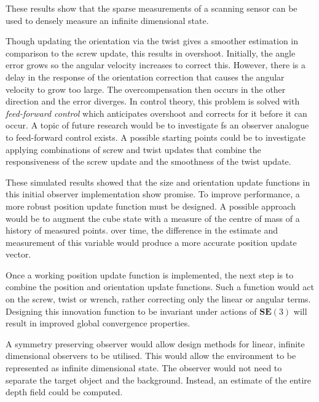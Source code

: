 These results show that the sparse measurements of a scanning sensor can be used to densely measure an infinite dimensional state. 

Though updating the orientation via the twist gives a smoother estimation in comparison to the screw update, this results in overshoot. Initially, the angle error grows so the angular velocity increases to correct this. However, there is a delay in the response of the orientation correction that causes the angular velocity to grow too large. The overcompensation then occurs in the other direction and the error diverges. In control theory, this problem is solved with \textit{feed-forward control} which anticipates overshoot and corrects for it before it can occur. A topic of future research would be to investigate fs an observer analogue to feed-forward control exists. A possible starting points could be to investigate applying combinations of screw and twist updates that combine the responsiveness of the screw update and the smoothness of the twist update. 

These simulated results showed that the size and orientation update functions in this initial observer implementation show promise. To improve performance, a more robust position update function must be designed. A possible approach would be to augment the cube state with a measure of the centre of mass of a history of measured points. over time, the difference in the estimate and measurement of this variable would produce a more accurate position update vector.

Once a working position update function is implemented, the next step is to combine the position and orientation update functions. Such a function would act on the screw, twist or wrench, rather correcting only the linear or angular terms. Designing this innovation function to be invariant under actions of $\mathbf{SE}(3)$ will result in improved global convergence properties.

A symmetry preserving observer would allow design methods for linear, infinite dimensional observers to be utilised. This would allow the environment to be represented as infinite dimensional state. The observer would not need to separate the target object and the background. Instead, an estimate of the entire depth field could be computed.